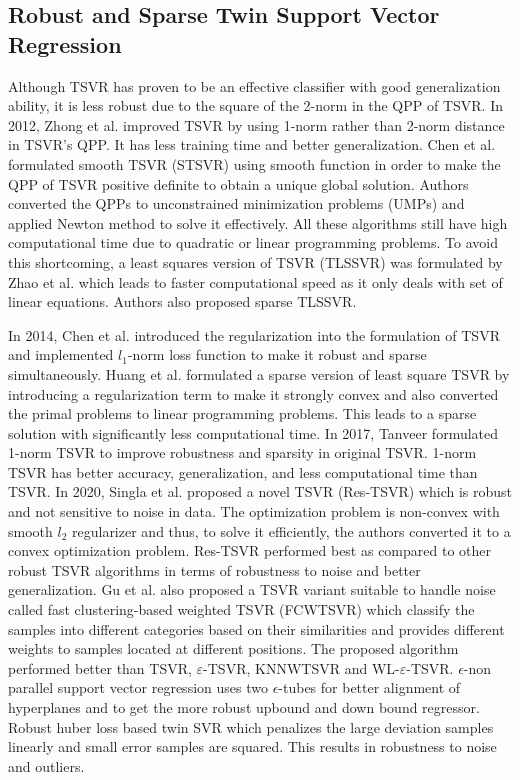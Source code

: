 \documentclass[pdflatex,sn-mathphys]{sn-jnl}%
\theoremstyle{thmstyleone}%
\theoremstyle{thmstyletwo}%
\theoremstyle{thmstylethree}%
\begin{document}
\subsection{Robust and Sparse Twin Support Vector Regression}

Although TSVR has proven to be an effective classifier with good generalization ability, it is less robust due to the square of the 2-norm in the QPP of TSVR. In 2012, Zhong et al. \cite{zhong2012training} improved TSVR by using 1-norm rather than 2-norm distance in TSVR's QPP. It has less training time and better generalization. Chen et al. \cite{chen2012smooth} formulated smooth TSVR (STSVR) using smooth function in order to make the QPP of TSVR positive definite to obtain a unique global solution. Authors converted the QPPs to unconstrained minimization problems (UMPs) and applied Newton method to solve it effectively. All these algorithms still have high computational time due to quadratic or linear programming problems. To avoid this shortcoming, a least squares version of TSVR (TLSSVR) was formulated by Zhao et al. \cite{zhao2013twin} which leads to faster computational speed as it only deals with set of linear equations. Authors also proposed sparse TLSSVR.

In 2014, Chen et al. \cite{chen2014improved} introduced the regularization into the formulation of TSVR and implemented $l_1$-norm loss function to make it robust and sparse simultaneously. Huang et al. \cite{huang2016sparse} formulated a sparse version of least square TSVR by introducing a regularization term to make it strongly convex and also converted the primal problems to linear programming problems. This leads to a sparse solution with significantly less computational time. In 2017, Tanveer \cite{tanveer2017linear} formulated 1-norm TSVR to improve robustness and sparsity in original TSVR. 1-norm TSVR has better accuracy, generalization, and less computational time than TSVR.
In 2020, Singla et al. \cite{singla2020robust} proposed a novel TSVR (Res-TSVR) which is robust and not sensitive to noise in data. The optimization problem is non-convex with smooth $l_2$ regularizer and thus, to solve it efficiently, the authors converted it to a convex optimization problem. Res-TSVR performed best as compared to other robust TSVR algorithms in terms of robustness to noise and better generalization. Gu et al. \cite{gu2020fast} also proposed a TSVR variant suitable to handle noise called fast clustering-based weighted TSVR (FCWTSVR) which classify the samples into different categories based on their similarities and provides different weights to samples located at
different positions. The proposed algorithm performed better than TSVR, $\varepsilon$-TSVR, KNNWTSVR and WL-$\varepsilon$-TSVR. $\epsilon$-non parallel support vector regression \cite{carrasco2019epsilon}  uses two $\epsilon$-tubes for better alignment of hyperplanes and to get the more robust upbound and down bound regressor. Robust huber loss based twin SVR \cite{balasundaram2020robust} which penalizes the large deviation samples linearly and small error samples are squared. This results in robustness to noise and outliers.
\end{document}
